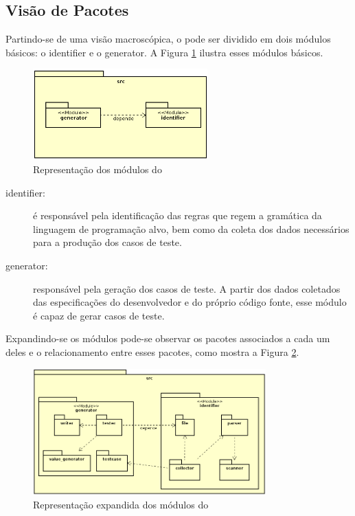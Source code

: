 \subsection{Visão de Pacotes}
Partindo-se de uma visão macroscópica, o \scarefault pode ser dividido em
dois módulos básicos: o \textsf{identifier} e o \textsf{generator}. A Figura
\ref{modules-scarefault} ilustra esses módulos básicos.

\begin{figure}[h]
  \centering
    \includegraphics[width=0.6\textwidth]{figuras/modules-scarefault.png}
    \caption{Representação dos módulos do \scarefault}
    \label{modules-scarefault}
\end{figure}
\FloatBarrier

\begin{description}
\item[identifier:] é responsável pela identificação das regras que regem
a gramática da linguagem de programação alvo, bem como da coleta dos dados
necessários para a produção dos casos de teste.
\item[generator:] responsável pela geração dos casos de teste. A partir dos dados
coletados das especificações do desenvolvedor e do próprio código fonte, esse
módulo é capaz de gerar casos de teste.
\end{description}

Expandindo-se os módulos pode-se observar os pacotes associados a cada um deles
e o relacionamento entre esses pacotes, como mostra a Figura
\ref{expand-modules-scarefault-1}.

\begin{figure}[h]
  \centering
    \includegraphics[width=0.8\textwidth]{figuras/expand-modules-scarefault-1.png}
    \caption{Representação expandida dos módulos do \scarefault}
    \label{expand-modules-scarefault-1}
\end{figure}

